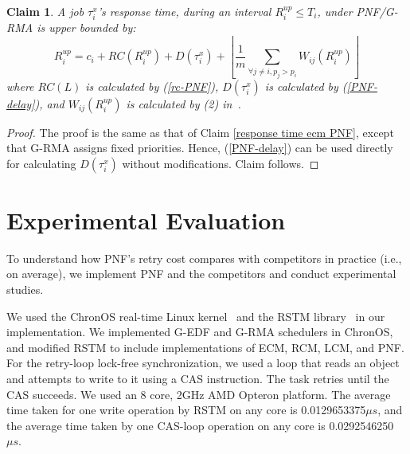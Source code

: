 \documentclass[twocolumn]{article}
\newtheorem{clm}{Claim}
\newtheorem{proof}{Proof}
\begin{document}
\begin{clm}\label{response rcm PNF}
A job $\tau_{i}^{x}$'s response time, during an interval $R_i^{up}\le T_{i}$, under PNF/G-RMA is upper bounded by: 
\begin{equation}
R_{i}^{up}=c_{i}+RC(R_i^{up})+D(\tau_{i}^{x})+\left\lfloor \frac{1}{m}\sum_{\forall j\ne i,p_j>p_i}W_{ij}(R_{i}^{up})\right\rfloor 
\end{equation}
where $RC(L)$ is calculated by (\ref{rc-PNF}), $D(\tau_{i}^{x})$
is calculated by (\ref{PNF-delay}), and $W_{ij}(R_{i}^{up})$
is calculated by (2) in~\cite{stmconcurrencycontrol:emsoft11}.
\end{clm}
\begin{proof}\normalfont
The proof is the same as that of Claim \ref{response time ecm PNF}, 
except that G-RMA assigns fixed priorities. Hence, (\ref{PNF-delay}) can be used directly for calculating $D(\tau_{i}^{x})$ without modifications. Claim follows.
\end{proof}


\section{Experimental Evaluation}\label{exp_eval}


To understand how PNF's retry cost compares with competitors in practice (i.e., on average), we implement PNF and the competitors and conduct experimental studies.


We used the ChronOS real-time Linux kernel~\cite{dellinger2011chronos}
and the RSTM library~\cite{marathe2006lowering} in our implementation. We implemented G-EDF and G-RMA schedulers in ChronOS, and modified RSTM to include implementations of ECM, RCM, LCM, and PNF. For the retry-loop lock-free synchronization, we used a loop that reads an object and attempts to write to it  using a CAS  instruction. The task retries until the CAS succeeds. We used an 8 core, 2GHz AMD Opteron platform. The average time taken for one write operation by RSTM on any core is 0.0129653375$\mu s$, and the average time taken by one CAS-loop operation on any core is 0.0292546250 $\mu s$.
\end{document}
